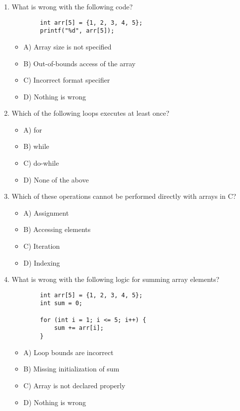 \documentclass[a4paper,12pt]{article}
\begin{document}
\begin{enumerate}
    \item What is wrong with the following code?

    \lstset{language=C}
    \begin{lstlisting}
        int arr[5] = {1, 2, 3, 4, 5};
        printf("%d", arr[5]);
    \end{lstlisting}    
    
    \begin{itemize}
        \item A) Array size is not specified
        \item B) Out-of-bounds access of the array
        \item C) Incorrect format specifier
        \item D) Nothing is wrong
    \end{itemize}

    \item Which of the following loops executes at least once?
    \begin{itemize}
        \item A) for
        \item B) while
        \item C) do-while
        \item D) None of the above
    \end{itemize}

    \item Which of these operations cannot be performed directly with arrays in C?
    \begin{itemize}
        \item A) Assignment
        \item B) Accessing elements
        \item C) Iteration
        \item D) Indexing
    \end{itemize}

    \item What is wrong with the following logic for summing array elements?

    \lstset{language=C}
    \begin{lstlisting}
        int arr[5] = {1, 2, 3, 4, 5};
        int sum = 0;
        
        for (int i = 1; i <= 5; i++) {
            sum += arr[i];
        }
    \end{lstlisting}

    \begin{itemize}
        \item A) Loop bounds are incorrect
        \item B) Missing initialization of sum
        \item C) Array is not declared properly
        \item D) Nothing is wrong
    \end{itemize}


\end{enumerate}
\end{document}
